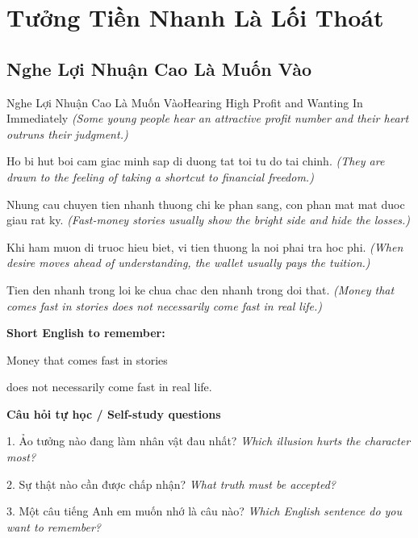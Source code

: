 \chapter{Tưởng Tiền Nhanh Là Lối Thoát}

\section{Nghe Lợi Nhuận Cao Là Muốn Vào}
\begin{truyen}{Nghe Lợi Nhuận Cao Là Muốn Vào}{Hearing High Profit and Wanting In Immediately}
\textit{(Some young people hear an attractive profit number and their heart outruns their judgment.)}

Ho bi hut boi cam giac minh sap di duong tat toi tu do tai chinh.
\textit{(They are drawn to the feeling of taking a shortcut to financial freedom.)}

Nhung cau chuyen tien nhanh thuong chi ke phan sang, con phan mat mat duoc giau rat ky.
\textit{(Fast-money stories usually show the bright side and hide the losses.)}

Khi ham muon di truoc hieu biet, vi tien thuong la noi phai tra hoc phi.
\textit{(When desire moves ahead of understanding, the wallet usually pays the tuition.)}

\end{truyen}

\begin{baihoc}
Tien den nhanh trong loi ke chua chac den nhanh trong doi that.
\textit{(Money that comes fast in stories does not necessarily come fast in real life.)}
\end{baihoc}

\begin{ghinhoanh}
\textbf{Short English to remember:}

Money that comes fast in stories

does not necessarily come fast in real life.

\end{ghinhoanh}

\begin{tuhocnhanh}
\textbf{Câu hỏi tự học / Self-study questions}

1. Ảo tưởng nào đang làm nhân vật đau nhất? \textit{Which illusion hurts the character most?}

2. Sự thật nào cần được chấp nhận? \textit{What truth must be accepted?}

3. Một câu tiếng Anh em muốn nhớ là câu nào? \textit{Which English sentence do you want to remember?}
\end{tuhocnhanh}
\ngancach

